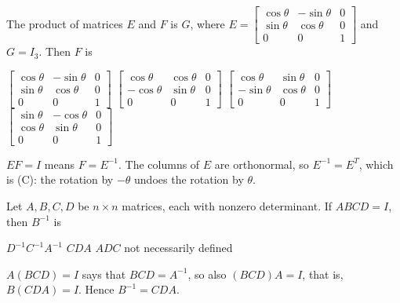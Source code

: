 \begin{question}[id=gate-me2006-1, source=GATE ME 2006]
The product of matrices $E$ and $F$ is $G$, where $E = \begin{bmatrix} \cos\theta & -\sin\theta & 0 \\ \sin\theta & \cos\theta & 0 \\ 0 & 0 & 1 \end{bmatrix}$ and $G = I_3$. Then $F$ is
\begin{options}
  \option $\begin{bmatrix} \cos\theta & -\sin\theta & 0 \\ \sin\theta & \cos\theta & 0 \\ 0 & 0 & 1 \end{bmatrix}$
  \option $\begin{bmatrix} \cos\theta & \cos\theta & 0 \\ -\cos\theta & \sin\theta & 0 \\ 0 & 0 & 1 \end{bmatrix}$
  \correct $\begin{bmatrix} \cos\theta & \sin\theta & 0 \\ -\sin\theta & \cos\theta & 0 \\ 0 & 0 & 1 \end{bmatrix}$
  \option $\begin{bmatrix} \sin\theta & -\cos\theta & 0 \\ \cos\theta & \sin\theta & 0 \\ 0 & 0 & 1 \end{bmatrix}$
\end{options}
\begin{solution}
$EF = I$ means $F = E^{-1}$. The columns of $E$ are orthonormal, so $E^{-1} = E^T$, which is (C): the rotation by $-\theta$ undoes the rotation by $\theta$.
\end{solution}
\end{question}

\begin{question}[id=gate-cs2004-2, source=GATE CS 2004]
Let $A, B, C, D$ be $n \times n$ matrices, each with nonzero determinant. If $ABCD = I$, then $B^{-1}$ is
\begin{options}
  \option $D^{-1}C^{-1}A^{-1}$
  \correct $CDA$
  \option $ADC$
  \option not necessarily defined
\end{options}
\begin{solution}
$A(BCD) = I$ says that $BCD = A^{-1}$, so also $(BCD)A = I$, that is, $B(CDA) = I$. Hence $B^{-1} = CDA$.
\end{solution}
\end{question}

